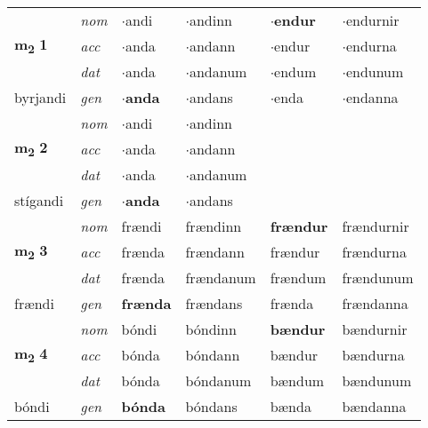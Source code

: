\begin{longtable}[l]{llllll}
\multirow{3}{*}{{{\textbf{m{\textsubscript{2}}} \Large{\textbf{1}}}}}  & {\footnotesize{{\textit{nom}}}} & $\cdot$andi & $\cdot$andinn    & \textbf{$\cdot$endur} & $\cdot$endurnir  \\*
 &  {\footnotesize{{\textit{acc}}}} & $\cdot$anda  & $\cdot$andann   & $\cdot$endur  & $\cdot$endurna \\*
 &  {\footnotesize{{\textit{dat}}}} & $\cdot$anda & $\cdot$andanum   & $\cdot$endum & $\cdot$endunum \\*
 {\footnotesize{byrjandi}} &   {\footnotesize{{\textit{gen}}}} & \textbf{$\cdot$anda}  & $\cdot$andans  & $\cdot$enda & $\cdot$endanna \\
\cmidrule{1-6}


\multirow{3}{*}{{{\textbf{m{\textsubscript{2}}} \Large{\textbf{2}}}}}  & {\footnotesize{{\textit{nom}}}} & $\cdot$andi & $\cdot$andinn    & \textbf{} &   \\*
 &  {\footnotesize{{\textit{acc}}}} & $\cdot$anda  & $\cdot$andann   &   &  \\*
 &  {\footnotesize{{\textit{dat}}}} & $\cdot$anda & $\cdot$andanum   &  &  \\*
 {\footnotesize{stígandi}} &   {\footnotesize{{\textit{gen}}}} & \textbf{$\cdot$anda}  & $\cdot$andans  &  &  \\
\cmidrule{1-6}


\multirow{3}{*}{{{\textbf{m{\textsubscript{2}}} \Large{\textbf{3}}}}}  & {\footnotesize{{\textit{nom}}}} & frændi & frændinn    & \textbf{frændur} & frændurnir  \\*
 &  {\footnotesize{{\textit{acc}}}} & frænda  & frændann   & frændur  & frændurna \\*
 &  {\footnotesize{{\textit{dat}}}} & frænda & frændanum   & frændum & frændunum \\*
 {\footnotesize{frændi}} &   {\footnotesize{{\textit{gen}}}} & \textbf{frænda}  & frændans  & frænda & frændanna \\
\cmidrule{1-6}


\multirow{3}{*}{{{\textbf{m{\textsubscript{2}}} \Large{\textbf{4}}}}}  & {\footnotesize{{\textit{nom}}}} & bóndi & bóndinn    & \textbf{bændur} & bændurnir  \\*
 &  {\footnotesize{{\textit{acc}}}} & bónda  & bóndann   & bændur  & bændurna \\*
 &  {\footnotesize{{\textit{dat}}}} & bónda & bóndanum   & bændum & bændunum \\*
 {\footnotesize{bóndi}} &   {\footnotesize{{\textit{gen}}}} & \textbf{bónda}  & bóndans  & bænda & bændanna \\
\cmidrule{1-6}



\end{longtable}
